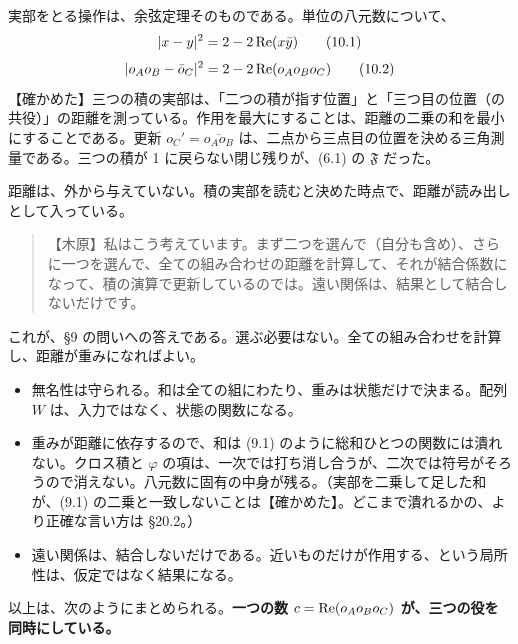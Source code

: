 \documentclass[
  a4paper,
]{ltjsarticle}
\providecommand{\tightlist}{%
  \setlength{\itemsep}{0pt}\setlength{\parskip}{0pt}}
\begin{document}
実部をとる操作は、余弦定理そのものである。単位の八元数について、 \[
\lvert x - y\rvert^2 = 2 - 2\,{\rm Re}(x\bar y) \tag{10.1}
\] \[
\lvert o_Ao_B - \bar o_C\rvert^2 = 2 - 2\,{\rm Re}(o_Ao_Bo_C) \tag{10.2}
\]
【確かめた】三つの積の実部は、「二つの積が指す位置」と「三つ目の位置（の共役）」の距離を測っている。作用を最大にすることは、距離の二乗の和を最小にすることである。更新
\(o_C' = \overline{o_Ao_B}\)
は、二点から三点目の位置を決める三角測量である。三つの積が 1
に戻らない閉じ残りが、(6.1) の \(\mathfrak{F}\) だった。

距離は、外から与えていない。積の実部を読むと決めた時点で、距離が読み出しとして入っている。

\begin{quote}
【木原】私はこう考えています。まず二つを選んで（自分も含め）、さらに一つを選んで、全ての組み合わせの距離を計算して、それが結合係数になって、積の演算で更新しているのでは。遠い関係は、結果として結合しないだけです。
\end{quote}

これが、§9
の問いへの答えである。選ぶ必要はない。全ての組み合わせを計算し、距離が重みになればよい。

\begin{itemize}
\tightlist
\item
  無名性は守られる。和は全ての組にわたり、重みは状態だけで決まる。配列
  \(W\) は、入力ではなく、状態の関数になる。
\item
  重みが距離に依存するので、和は (9.1)
  のように総和ひとつの関数には潰れない。クロス積と \(\varphi\)
  の項は、一次では打ち消し合うが、二次では符号がそろうので消えない。八元数に固有の中身が残る。（実部を二乗して足した和が、(9.1)
  の二乗と一致しないことは【確かめた】。どこまで潰れるかの、より正確な言い方は
  §20.2。）
\item
  遠い関係は、結合しないだけである。近いものだけが作用する、という局所性は、仮定ではなく結果になる。
\end{itemize}

以上は、次のようにまとめられる。\textbf{一つの数
\(c = {\rm Re}(o_Ao_Bo_C)\) が、三つの役を同時にしている。}
\end{document}
